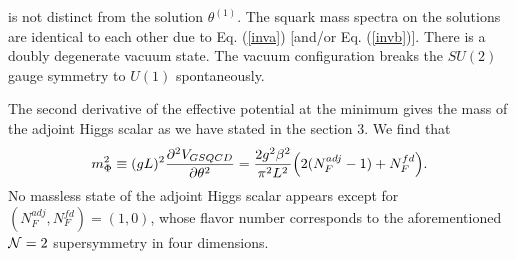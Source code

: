 \documentclass[a4paper,12pt]{article}
\begin{document}
is not distinct from the solution $\theta^{(1)}$. 
The squark mass spectra on the solutions are identical to each other
due to Eq. (\ref{inva}) [and/or Eq. (\ref{invb})].
There is a doubly degenerate vacuum state. The vacuum configuration breaks 
the $SU(2)$ gauge symmetry to $U(1)$ spontaneously.
\par
The second derivative of the effective potential at the minimum 
gives the mass of the adjoint Higgs scalar as we have stated
in the section $3$. We find that
\begin{equation}
m^2_{\Phi}\equiv (gL)^2{{\partial^2 V_{GSQCD}}\over{\partial\theta^2}}
={{2g^2\beta^2}\over{\pi^2 L^2}}\Bigl(2(N_F^{adj}-1)+N_F^{fd}\Bigr).
\end{equation} 
No massless state of the adjoint Higgs scalar appears except 
for $(N_F^{adj},N_F^{fd})=(1,0)$, whose flavor number corresponds 
to the aforementioned ${\cal N}=2$ supersymmetry in four dimensions.
\par
\end{document}
